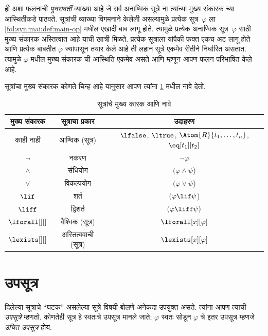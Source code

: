 \begin{explain}
ही अशा फलनाची \emph{पुनरावर्ती} व्याख्या आहे जे सर्व अनाण्विक
सूत्रे ना त्यांच्या मुख्य संकारक च्या आस्थितीकडे पाठवते.
सूत्रांची व्याख्या विगमनाने केलेली असल्यामुळे प्रत्येक
सूत्र~$\varphi$ ला \ref{fol:syn:mai:def:main-op} मधील एखादी बाब लागू होते.
त्यामुळे प्रत्येक अनाण्विक सूत्र~$\varphi$ साठी मुख्य संकारक
अस्तित्वात आहे याची खात्री मिळते. प्रत्येक सूत्राला यांपैकी
फक्त एकच अट लागू होते आणि प्रत्येक बाबतीत $\varphi$ ज्यांपासून तयार केले
आहे ती लहान सूत्रे एकमेव रीतीने निर्धारित असतात. त्यामुळे $\varphi$
मधील मुख्य संकारक ची आस्थिति एकमेव असते आणि म्हणून आपण फलन
परिभाषित केले आहे.
\end{explain}

सूत्रांचा मुख्य संकारक कोणते चिन्ह आहे यानुसार आपण त्यांना
\ref{fol:syn:mai:tab:main-op} मधील नावे देतो.

\begin{table}[!h]
\centering
\begin{tabular}{c | c | c}
मुख्य संकारक & सूत्राचा प्रकार & उदाहरण\\
\hline
काही नाही & आण्विक (सूत्र) &
$\lfalse$,
$\ltrue$,
$\Atom{R}{t_1, \dots, t_n}$,
$\eq[t_1][t_2]$\\
$\lnot$ & नकरण & $\lnot \varphi$ \\
$\land$ & संधियोग & $(\varphi \land \psi$) \\
$\lor$ & विकल्पयोग & $(\varphi \lor \psi$) \\
$\lif$ & शर्त & $(\varphi \lif \psi$) \\
$\liff$ & द्विशर्त & $(\varphi \liff \psi)$ \\
$\lforall[][]$ & वैश्विक (सूत्र)& $\lforall[x][\varphi]$ \\
$\lexists[][]$ & अस्तित्ववाची (सूत्र)& $\lexists[x][\varphi]$
\end{tabular}
\caption{सूत्रांचे मुख्य कारक आणि नावे}
\label{fol:syn:mai:tab:main-op}
\end{table}












\section{उपसूत्र}\label{fol:syn:sbf:sec}

\begin{explain}
दिलेल्या सूत्राचे ``घटक'' असलेल्या सूत्रे विषयी बोलणे अनेकदा
उपयुक्त असते. त्यांना आपण त्याची \emph{उपसूत्रे} म्हणतो. कोणतेही
सूत्र हे स्वतःचे उपसूत्र मानले जाते; $\varphi$ स्वतः सोडून
$\varphi$ चे इतर उपसूत्र म्हणजे \emph{उचित उपसूत्र} होय.
\end{explain}

